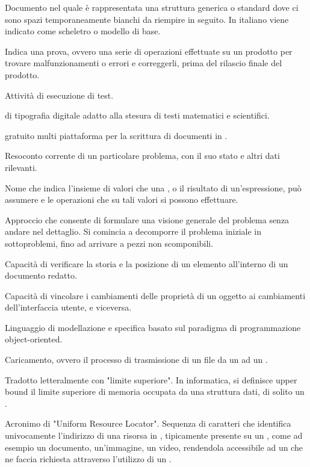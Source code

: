 

{Documento nel quale è rappresentata una struttura generica o standard dove ci sono spazi temporaneamente bianchi da riempire in seguito. In italiano viene indicato come scheletro o modello di base.}

{Indica una prova, ovvero una serie di operazioni effettuate su un prodotto per trovare malfunzionamenti o errori e correggerli, prima del rilascio finale del prodotto.}

{Attività di esecuzione di test.}

{ di tipografia digitale adatto alla stesura di testi matematici e scientifici.}

{ gratuito multi piattaforma per la scrittura di documenti in .}

{Resoconto corrente di un particolare problema, con il suo stato e altri dati rilevanti.}

{Nome che indica l'insieme di valori che una , o il risultato di un'espressione, può assumere e le operazioni che su tali valori si possono effettuare.}

{Approccio che consente di formulare una visione generale del problema senza andare nel dettaglio. Si comincia a decomporre il problema iniziale in sottoproblemi, fino ad arrivare a pezzi non scomponibili.}

{Capacità di verificare la storia e la posizione di un elemento all'interno di un documento redatto.}

{Capacità di vincolare i cambiamenti delle proprietà di un oggetto ai cambiamenti dell'interfaccia utente, e viceversa.}


{Linguaggio di modellazione e specifica basato sul paradigma di programmazione object-oriented.}

{Caricamento, ovvero il processo di trasmissione di un file da un  ad un .}

{Tradotto letteralmente con "limite superiore". In informatica, si definisce upper bound il limite superiore di memoria occupata da una struttura dati, di solito un .}

{Acronimo di "Uniform Resource Locator". Sequenza di caratteri che identifica univocamente l'indirizzo di una risorsa in , tipicamente presente su un  , come ad esempio un documento, un'immagine, un video, rendendola accessibile ad un  che ne faccia richiesta attraverso l'utilizzo di un  .}

